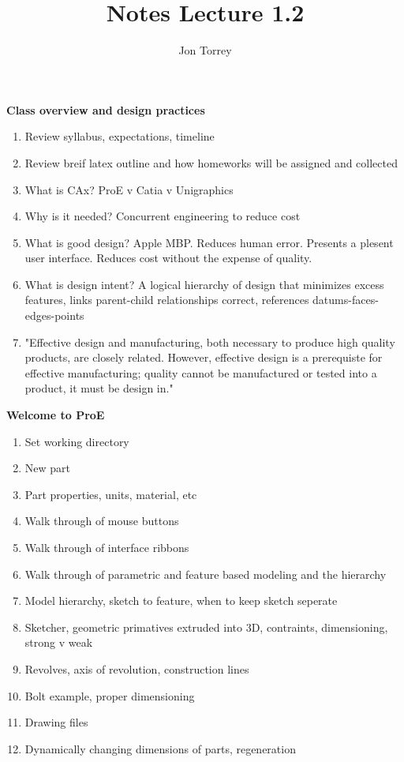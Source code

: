 \documentclass{homework}
\title{Notes Lecture 1.2}
\author{Jon Torrey}
\begin{document}
\textbf{Class overview and design practices}

\begin{enumerate}
  \item Review syllabus, expectations, timeline
  \item Review breif latex outline and how homeworks will be assigned and collected
  \item What is CAx? ProE v Catia v Unigraphics
  \item Why is it needed? Concurrent engineering to reduce cost
  \item What is good design? Apple MBP. Reduces human error. Presents a plesent user interface. Reduces cost without the expense of quality.
  \item What is design intent? A logical hierarchy of design that minimizes excess features, links parent-child relationships correct, references datums-faces-edges-points
  \item "Effective design and manufacturing, both necessary to produce high quality products, are closely related. However, effective design is a prerequiste for effective manufacturing; quality cannot be manufactured or tested into a product, it must be design in."
\end{enumerate}

\textbf{Welcome to ProE}

\begin{enumerate}
  \item Set working directory
  \item New part
  \item Part properties, units, material, etc
  \item Walk through of mouse buttons
  \item Walk through of interface ribbons
  \item Walk through of parametric and feature based modeling and the hierarchy
  \item Model hierarchy, sketch to feature, when to keep sketch seperate
  \item Sketcher, geometric primatives extruded into 3D, contraints, dimensioning, strong v weak
  \item Revolves, axis of revolution, construction lines
  \item Bolt example, proper dimensioning
  \item Drawing files
  \item Dynamically changing dimensions of parts, regeneration
\end{enumerate}
\end{document}
